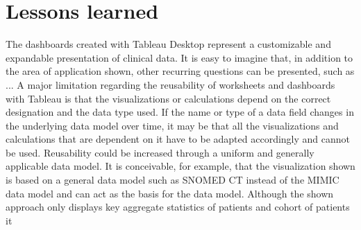 \documentclass[aac]{iosart2x}
\begin{document}
\section{Lessons learned}\label{s5}
The dashboards created with Tableau Desktop represent a customizable and expandable presentation of clinical data. It is easy to imagine that, in addition to the area of application shown, other recurring questions can be presented, such as ...
A major limitation regarding the reusability of worksheets and dashboards with Tableau is that the visualizations or calculations depend on the correct designation and the data type used. If the name or type of a data field changes in the underlying data model over time, it may be that all the visualizations and calculations that are dependent on it have to be adapted accordingly and cannot be used. Reusability could be increased through a uniform and generally applicable data model. It is conceivable, for example, that the visualization shown is based on a general data model such as SNOMED CT instead of the MIMIC data model and can act as the basis for the data model.
Although the shown approach only displays key aggregate statistics of patients and cohort of patients it 






\end{document}
